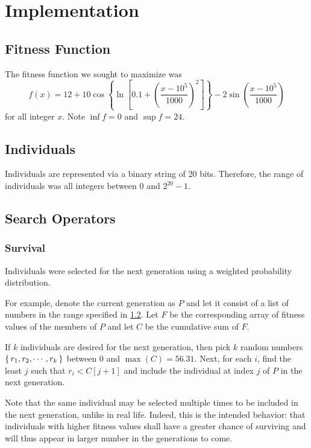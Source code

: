 \documentclass{article}
\begin{document}
\section{Implementation}
  \subsection{Fitness Function}
    The fitness function we sought to maximize was
    $$
      f(x)= 12 +
      10\cos\left\{
        \ln\left[0.1 + \left(
          \frac{x-{10}^5}{1000}
        \right)^2
        \right]
      \right\}
      -2\sin\left(
        \frac{x-{10}^5}{1000}
      \right)
    $$
    for all integer $x$. Note $\inf{f}=0$ and $\sup{f}=24$.
    

  \subsection{Individuals}\label{individual-ranges}
    Individuals are represented via a binary string of 20 bits. Therefore, the
    range of individuals was all integers between $0$ and $2^{20}-1$.

  \subsection{Search Operators}
    \subsubsection{Survival}
      Individuals were selected for the next generation using a weighted
      probability distribution.

      For example, denote the current generation as $P$ and let it consist
      of a list of numbers in the range specified in \ref{individual-ranges}.
      Let $F$ be the corresponding array of fitness values of the members of
      $P$ and let $C$ be the cumulative sum of $F$.
      

      If $k$ individuals are desired for the next generation, then pick $k$
      random numbers $\set{r_1,r_2,\cdots,r_k}$ between $0$ and $\max(C)=56.31$.
      Next, for each $i$, find the least $j$ such that $r_i < C[j+1]$ and
      include the individual at index $j$ of $P$ in the next generation.

      Note that the same individual may be selected multiple times to be
      included in the next generation, unlike in real life. Indeed, this is the
      intended behavior: that individuals with higher fitness values shall have
      a greater chance of surviving and will thus appear in larger number in the
      generations to come.
\end{document}
